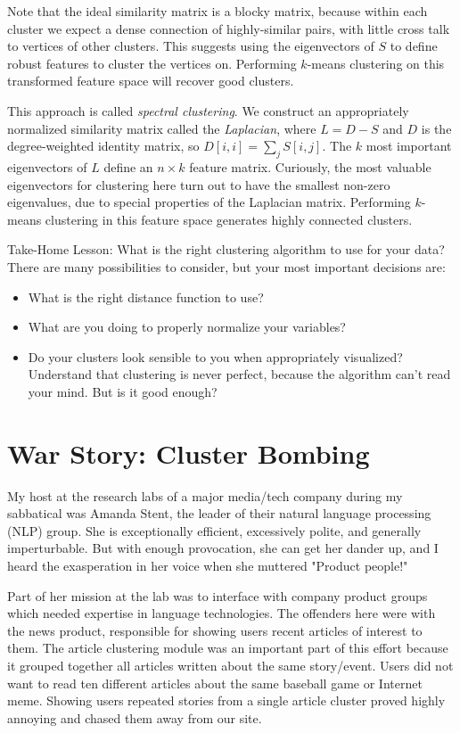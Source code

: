 \documentclass[10pt]{article}
\begin{document}
Note that the ideal similarity matrix is a blocky matrix, because within each cluster we expect a dense connection of highly-similar pairs, with little cross talk to vertices of other clusters. This suggests using the eigenvectors of $S$ to define robust features to cluster the vertices on. Performing $k$-means clustering on this transformed feature space will recover good clusters.

This approach is called \emph{spectral clustering}. We construct an appropriately normalized similarity matrix called the \emph{Laplacian}, where $L=D-S$ and $D$ is the degree-weighted identity matrix, so $D[i, i]=\sum_{j} S[i, j]$. The $k$ most important eigenvectors of $L$ define an $n \times k$ feature matrix. Curiously, the most valuable eigenvectors for clustering here turn out to have the smallest non-zero eigenvalues, due to special properties of the Laplacian matrix. Performing $k$-means clustering in this feature space generates highly connected clusters.

Take-Home Lesson: What is the right clustering algorithm to use for your data? There are many possibilities to consider, but your most important decisions are:

\begin{itemize}
  \item What is the right distance function to use?
  \item What are you doing to properly normalize your variables?
  \item Do your clusters look sensible to you when appropriately visualized? Understand that clustering is never perfect, because the algorithm can't read your mind. But is it good enough?
\end{itemize}

\section{War Story: Cluster Bombing}

My host at the research labs of a major media/tech company during my sabbatical was Amanda Stent, the leader of their natural language processing (NLP) group. She is exceptionally efficient, excessively polite, and generally imperturbable. But with enough provocation, she can get her dander up, and I heard the exasperation in her voice when she muttered "Product people!"

Part of her mission at the lab was to interface with company product groups which needed expertise in language technologies. The offenders here were with the news product, responsible for showing users recent articles of interest to them. The article clustering module was an important part of this effort because it grouped together all articles written about the same story/event. Users did not want to read ten different articles about the same baseball game or Internet meme. Showing users repeated stories from a single article cluster proved highly annoying and chased them away from our site.
\end{document}

